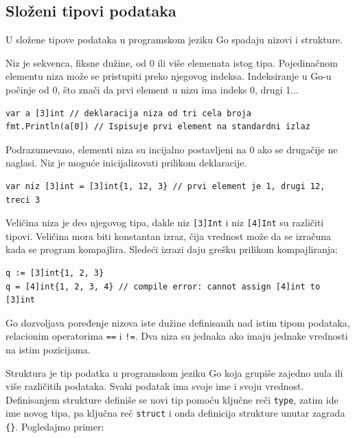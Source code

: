 \documentclass[a4paper]{article}
\begin{document}
\subsection{Složeni tipovi podataka}
\label{subsec:slozeni_tipovi}
U složene tipove podataka u programskom jeziku Go spadaju nizovi i strukture.

Niz je sekvenca, fiksne dužine, od 0 ili više elemenata istog tipa. Pojedinačnom elementu niza može se pristupiti preko njegovog indeksa. Indeksiranje u Go-u počinje od 0, što znači da prvi element u nizu ima indeks 0, drugi 1... 


\begin{lstlisting}[caption={Deklaracija nizova},frame=single, label=Deklaracija_nizova]
var a [3]int // deklaracija niza od tri cela broja
fmt.Println(a[0]) // Ispisuje prvi element na standardni izlaz
\end{lstlisting}


Podrazumevano, elementi niza su incijalno postavljeni na 0 ako se drugačije ne naglasi. 
Niz je moguće inicijalizovati prilikom deklaracije. 

\begin{lstlisting}[caption={Inicijalizacija niza prilikom deklaracije},frame=single, label=Inicijalizacija_niza_prilikom_deklaracije]
var niz [3]int = [3]int{1, 12, 3} // prvi element je 1, drugi 12, treci 3
\end{lstlisting}


Veličina niza je deo njegovog tipa, dakle niz \texttt{[3]Int} i niz \texttt{[4]Int} su različiti tipovi. Veličina mora biti konstantan izraz, čija vrednost može da se izračuna kada se program kompajlira. Sledeći izrazi daju grešku prilikom kompajliranja:

\begin{lstlisting}[caption={Primer greške sa nizovima},frame=single, label=Primer_greske_sa_nizovima]
q := [3]int{1, 2, 3}
q = [4]int{1, 2, 3, 4} // compile error: cannot assign [4]int to [3]int
\end{lstlisting}

Go dozvoljava poređenje nizova iste dužine definisanih nad istim tipom podataka, relacionim operatorima \texttt{==} i \texttt{!=}. Dva niza su jednaka ako imaju jednake vrednosti na istim pozicijama.


Struktura je tip podatka u programskom jeziku Go koja grupiše zajedno nula ili više različitih podataka. Svaki podatak ima svoje ime i svoju vrednost. Definisanjem strukture definiše se novi tip pomoću ključne reči \texttt{type}, zatim ide ime novog tipa, pa ključna reč \texttt{struct} i onda definicija strukture unutar zagrada \texttt{\{\}}. Pogledajmo primer:
\end{document}
